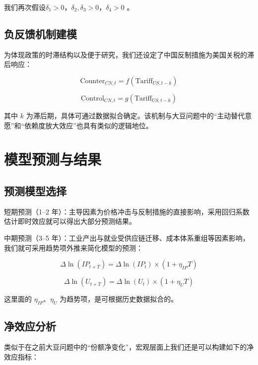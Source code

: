\documentclass[12pt]{ctexart}
\begin{document}
我们再次假设$\delta_1>0$，$\delta_2,\delta_3>0$，$\delta_4>0$ 。

\subsection{负反馈机制建模}

为体现政策的时滞结构以及便于研究，我们还设定了中国反制措施为美国关税的滞后响应：

\begin{equation}
\text{Counter}_{CN,t} = f(\text{Tariff}_{US,t-k})
\end{equation}

\begin{equation}
\text{Control}_{CN,t} = g(\text{Tariff}_{US,t-k})
\end{equation}

其中 $k$ 为滞后期，具体可通过数据拟合确定。该机制与大豆问题中的“主动替代意愿”和“依赖度放大效应”也具有类似的逻辑地位。

\section{模型预测与结果}

\subsection{预测模型选择}

短期预测（1--2 年）：主导因素为价格冲击与反制措施的直接影响，采用回归系数估计即时效应就可以得出大部分预测结果。

中期预测（3--5 年）：工业产出与就业受供应链迁移、成本体系重组等因素影响，我们就可采用趋势项外推来简化模型的预测：

\begin{equation}
\Delta \ln(IP_{t+T}) = \Delta \ln(IP_t) \times (1 + \eta_{IP} T)
\end{equation}

\begin{equation}
\Delta \ln(U_{t+T}) = \Delta \ln(U_t) \times (1 + \eta_{U} T)
\end{equation}

这里面的 $\eta_{IP}$、$\eta_{U}$ 为趋势项，是可根据历史数据拟合的。

\subsection{净效应分析}

类似于在之前大豆问题中的“份额净变化”，宏观层面上我们还是可以构建如下的净效应指标：
\end{document}
